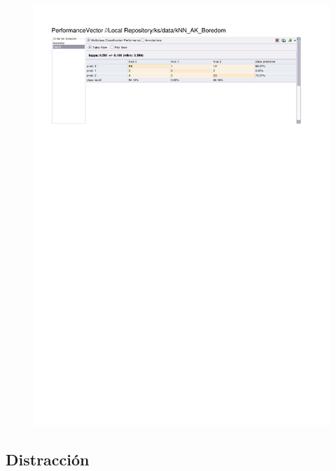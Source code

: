\begin{figure}[htp]
  \centerline{\includegraphics[trim=0 680 0 60,clip,width=16.09cm]{results/kNN_K_Boredom.pdf}} \caption{
} \label{kNN_K_Boredom}
\end{figure}

\clearpage
\FloatBarrier
\subsection{Distracción}

